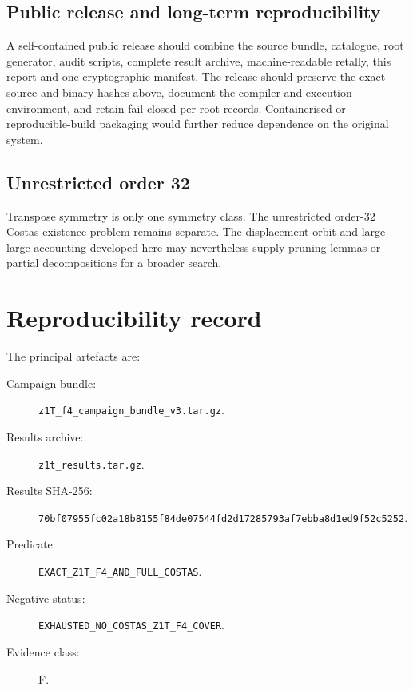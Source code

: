 \documentclass[11pt,a4paper]{article}
\theoremstyle{definition}\newtheorem{definition}[theorem]{Definition}\newtheorem{remark}[theorem]{Remark}
\newcommand{\code}[1]{\texttt{#1}}
\begin{document}
\subsection{Public release and long-term reproducibility}
A self-contained public release should combine the source bundle, catalogue, root generator, audit scripts, complete result archive, machine-readable retally, this report and one cryptographic manifest.  The release should preserve the exact source and binary hashes above, document the compiler and execution environment, and retain fail-closed per-root records.  Containerised or reproducible-build packaging would further reduce dependence on the original system.

\subsection{Unrestricted order 32}
Transpose symmetry is only one symmetry class.  The unrestricted order-$32$ Costas existence problem remains separate.  The displacement-orbit and large--large accounting developed here may nevertheless supply pruning lemmas or partial decompositions for a broader search.

\section{Reproducibility record}
The principal artefacts are:
\begin{description}
\item[Campaign bundle:] \code{z1T\_f4\_campaign\_bundle\_v3.tar.gz}.
\item[Results archive:] \code{z1t\_results.tar.gz}.
\item[Results SHA-256:] \code{70bf07955fc02a18b8155f84de07544fd2d17285793af7ebba8d1ed9f52c5252}.
\item[Predicate:] \code{EXACT\_Z1T\_F4\_AND\_FULL\_COSTAS}.
\item[Negative status:] \code{EXHAUSTED\_NO\_COSTAS\_Z1T\_F4\_COVER}.
\item[Evidence class:] F.
\end{description}
\end{document}
